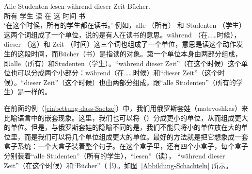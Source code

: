 \ea
\label{Beispiel-Alle-Studenten-lesen}
\gll Alle Studenten lesen während dieser Zeit Bücher.\\
     所有  学生  读  在  这   时间 书\\
\glt `在这个时候，所有的学生都在读书。'
\z
例如，alle （所有） 和 Studenten （学生）这两个词组成了一个单位，说的是有人在读书的意思。während （在……时候），dieser （这）和 Zeit （时间）这三个词也组成了一个单位，意思是读这个动作发生的这段时间，而Bücher（书）是指读的对象。第一个单位本身由两部分组成，即alle（所有）和Studenten（学生）。“während dieser Zeit”（在这个时候）这个单位也可以分成两个小部分：während（在……时候）和“dieser Zeit”（这个时候）。“dieser Zeit”（这个时候）也由两部分组成，跟“alle Studenten”（所有的学生）是一样的。

在前面的例（\ref{einbettung-dass-Saetze}）中，我们用俄罗斯套娃（matryoshkas）来比喻语言中的嵌套现象。这里，我们也可以将（）分成更小的单位，从而组成更大的单位。但是，与俄罗斯套娃的隐喻不同的是，我们不能只将小的单位放在大的单位里，而是我们可以将几个单位组成更大的单位。最好的方法就是把它想象成一套盒子系统：一个大盒子装着整个句子。在这个盒子里，还有四个小盒子，每个盒子分别装着“alle Studenten”（所有的学生），“lesen”（读）， “während dieser Zeit”（在这个时候）和“Bücher”（书）。如图~\vref{Abbildung-Schachteln} 所示。

